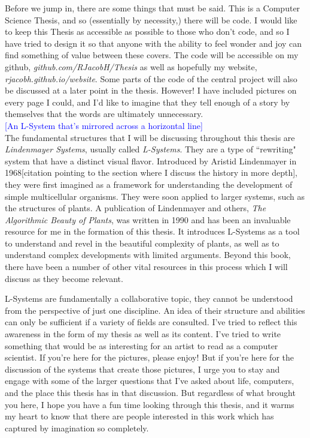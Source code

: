 \documentclass[12pt,twoside]{reedthesis}
\begin{document}
Before we jump in, there are some things that must be said. This is a Computer Science Thesis, and so (essentially by necessity,) there will be code. I would like to keep this Thesis as accessible as possible to those who don’t code, and so I have tried to design it so that anyone with the ability to feel wonder and joy can find something of value between these covers. The code will be accessible on my github, \textit{github.com/RJacobH/Thesis} as well as hopefully my website, \textit{rjacobh.github.io/website}. Some parts of the code of the central project will also be discussed at a later point in the thesis. However! I have included pictures on every page I could, and I’d like to imagine that they tell enough of a story by themselves that the words are ultimately unnecessary.\\

\textcolor{blue}{[An L-System that's mirrored across a horizontal line]}\\

The fundamental structures that I will be discussing throughout this thesis are \textit{Lindenmayer Systems}, usually called \textit{L-Systems}. They are a type of ``rewriting" system that have a distinct visual flavor. Introduced by Aristid Lindenmayer in 1968[citation pointing to the section where I discuss the history in more depth], they were first imagined as a framework for understanding the development of simple multicellular organisms. They were soon applied to larger systems, such as the structures of plants. A publication of Lindenmayer and others, \textit{The Algorithmic Beauty of Plants}, was written in 1990 and has been an invaluable resource for me in the formation of this thesis. It introduces L-Systems as a tool to understand and revel in the beautiful complexity of plants, as well as to understand complex developments with limited arguments. Beyond this book, there have been a number of other vital resources in this process which I will discuss as they become relevant.

L-Systems are fundamentally a collaborative topic, they cannot be understood from the perspective of just one discipline. An idea of their structure and abilities can only be sufficient if a variety of fields are consulted. I've tried to reflect this awareness in the form of my thesis as well as its content. I've tried to write something that would be as interesting for an artist to read as a computer scientist. If you're here for the pictures, please enjoy! But if you're here for the discussion of the systems that create those pictures, I urge you to stay and engage with some of the larger questions that I've asked about life, computers, and the place this thesis has in that discussion. But regardless of what brought you here, I hope you have a fun time looking through this thesis, and it warms my heart to know that there are people interested in this work which has captured by imagination so completely.
\end{document}
